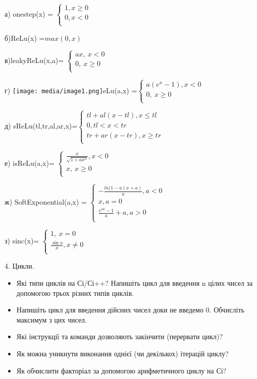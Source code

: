 \documentclass[]{article}
\begin{document}
а) onestep(x) = \(\left\{ \begin{matrix}
1,x \geq 0 \\
0,x < 0 \\
\end{matrix} \right.\ \)

б)ReLu(x) =\(max(0,x)\)

в)leakyReLu(x,a)= \(\left\{ \begin{matrix}
ax,\ x < 0 \\
0,\ x \geq 0 \\
\end{matrix} \right.\ \)

г) \texttt{[image: media/image1.png]}eLu(a,x) =\(\left\{ \begin{matrix}
a(e^{x} - 1),x < 0 \\
0,\ x \geq 0 \\
\end{matrix} \right.\ \)

д) sReLu(tl,tr,al,ar,x)=\(\left\{ \begin{matrix}
tl + al\left( x - tl \right),x \leq tl \\
0,tl < x < tr \\
tr + ar\left( x - tr \right),x \geq tr \\
\end{matrix} \right.\ \)

е) isReLu(a,x)= \(\left\{ \begin{matrix}
\frac{x}{\sqrt{1 + ax^{2}}},x < 0 \\
x,\ x \geq 0 \\
\end{matrix} \right.\ \)

ж) SoftExponential(a,x) = \(\left\{ \begin{matrix}
 - \frac{ln(1 - a(x + a)}{a},a < 0 \\
x,a = 0 \\
\frac{e^{\text{ax}} - 1}{a} + a,a > 0 \\
\end{matrix} \right.\ \)

з) sinc(x)= \(\left\{ \begin{matrix}
1,\ x = 0 \\
\frac{\sin x}{x},x \neq 0 \\
\end{matrix} \right.\ \)

4. Цикли.

\begin{itemize}
\item
  Які типи циклів на Сі/Сі++? Напишіть цикл для введення n цілих чисел
  за допомогою трьох різних типів циклів.
\item
  Напишіть цикл для введення дійсних чисел доки не введемо 0. Обчисліть
  максимум з цих чисел.
\item
  Які інструкції та команди дозволяють закінчити (перервати цикл)?
\item
  Як можна уникнути виконання однієї (чи декількох) ітерацій циклу?
\item
  Як обчислити факторіал за допомогою арифметичного циклу на Сі?
\end{itemize}
\end{document}
